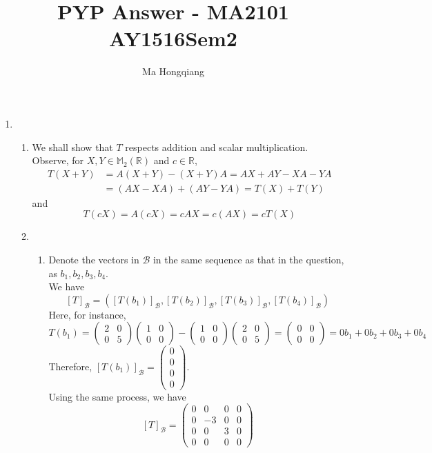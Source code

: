 \documentclass[12pt]{article}
\theoremstyle{definition}
\begin{document}
\title{PYP Answer - MA2101 AY1516Sem2}
\author{Ma Hongqiang}
\maketitle
\begin{enumerate}
  \item %
  \begin{enumerate}
    \item We shall show that $T$ respects addition and scalar multiplication.\\Observe, for $X,Y\in \mathbb{M}_2(\mathbb{R})$ and $c\in \mathbb{R}$,
    \begin{align*}
    T(X+Y)&=A(X+Y)-(X+Y)A =AX+AY-XA-YA\\ 
    &= (AX-XA)+(AY-YA)=T(X)+T(Y) 
    \end{align*}
    and
    \[
T(cX)=A(cX)=cAX = c(AX) = cT(X)
    \]
    \item
    \begin{enumerate}\item Denote the vectors in $\mathcal{B}$ in the same sequence as that in the question, as $b_1,b_2,b_3,b_4$. \\We have
    \[
    [T]_\mathcal{B}=([T(b_1)]_\mathcal{B},[T(b_2)]_\mathcal{B},[T(b_3)]_\mathcal{B},[T(b_4)]_\mathcal{B})
    \]
    Here, for instance,
    \[
T(b_1) = \begin{pmatrix}2&0\\0&5\end{pmatrix}\begin{pmatrix}1&0\\0&0\end{pmatrix}-\begin{pmatrix}1&0\\0&0\end{pmatrix}\begin{pmatrix}2&0\\0&5\end{pmatrix}=\begin{pmatrix}0&0\\0&0\end{pmatrix}=0b_1+0b_2+0b_3+0b_4
    \]
    Therefore, $[T(b_1)]_\mathcal{B} = \begin{pmatrix}0\\0\\0\\0\end{pmatrix}$.\\
    Using the same process, we have
    \[
[T]_\mathcal{B} = \begin{pmatrix}0&0&0&0\\0&-3&0&0\\0&0&3&0\\0&0&0&0\end{pmatrix}
\]
\end{enumerate}
\end{enumerate}
\end{enumerate}
\end{document}
